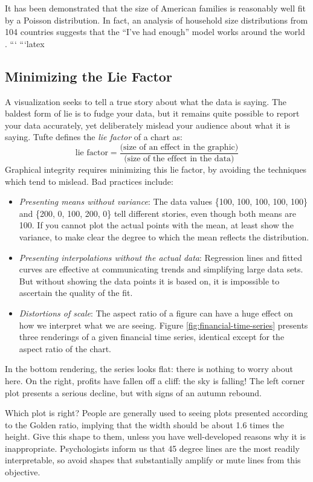 \documentclass[10pt]{article}
\begin{document}
It has been demonstrated that the size of American families is reasonably well fit by a Poisson distribution. In fact, an analysis of household size distributions from 104 countries suggests that the “I’ve had enough” model works around the world \cite{JLSI99}.
```
```latex
\subsection{Minimizing the Lie Factor}
A visualization seeks to tell a true story about what the data is saying. The baldest form of lie is to fudge your data, but it remains quite possible to report your data accurately, yet deliberately mislead your audience about what it is saying. Tufte defines the \emph{lie factor} of a chart as:
\[
\text{lie factor} = \frac{\text{(size of an effect in the graphic)}}{\text{(size of the effect in the data)}}
\]
Graphical integrity requires minimizing this lie factor, by avoiding the techniques which tend to mislead. Bad practices include:
\begin{itemize}
  \item \emph{Presenting means without variance}: The data values \{100, 100, 100, 100, 100\} and \{200, 0, 100, 200, 0\} tell different stories, even though both means are 100. If you cannot plot the actual points with the mean, at least show the variance, to make clear the degree to which the mean reflects the distribution.
  \item \emph{Presenting interpolations without the actual data}: Regression lines and fitted curves are effective at communicating trends and simplifying large data sets. But without showing the data points it is based on, it is impossible to ascertain the quality of the fit.
  \item \emph{Distortions of scale}: The aspect ratio of a figure can have a huge effect on how we interpret what we are seeing. Figure \ref{fig:financial-time-series} presents three renderings of a given financial time series, identical except for the aspect ratio of the chart.
\end{itemize}

In the bottom rendering, the series looks flat: there is nothing to worry about here. On the right, profits have fallen off a cliff: the sky is falling! The left corner plot presents a serious decline, but with signs of an autumn rebound.

Which plot is right? People are generally used to seeing plots presented according to the Golden ratio, implying that the width should be about 1.6 times the height. Give this shape to them, unless you have well-developed reasons why it is inappropriate. Psychologists inform us that 45 degree lines are the most readily interpretable, so avoid shapes that substantially amplify or mute lines from this objective.
\end{document}
